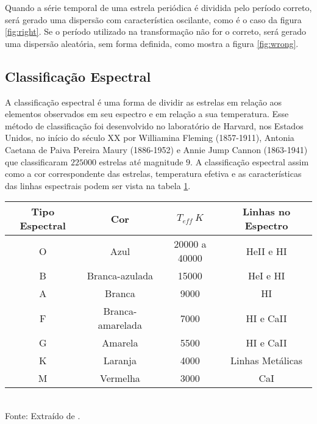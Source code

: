 Quando a série temporal de uma estrela periódica é dividida pelo período correto, será gerado uma dispersão com característica oscilante, como é o caso da figura \ref{fig:right}. Se o período utilizado na transformação não for o correto, será gerado uma dispersão aleatória, sem forma definida, como mostra a figura \ref{fig:wrong}.


\subsection{Classificação Espectral}

A classificação espectral é uma forma de dividir as estrelas em relação aos elementos observados em seu espectro e em relação a sua temperatura. Esse método de classificação foi desenvolvido no laboratório de Harvard, nos Estados Unidos, no início do século XX %
por Williamina Fleming (1857-1911), Antonia Caetana de Paiva Pereira Maury (1886-1952) e Annie Jump Cannon (1863-1941) que classificaram $225000$ estrelas até magnitude $9$.  A classificação espectral assim como a cor correspondente das estrelas, temperatura efetiva e as características das linhas espectrais podem ser vista na tabela \ref{tab:tipo_espectral}.

\begin{table}[!ht]
\begin{center}
\begin{tabular}{c|c|c|c}
\toprule%
Tipo Espectral & Cor & $T_{eff} \ \si{K}$ & Linhas no Espectro  \\
\midrule%
O & Azul & 20000 a 40000 & HeII e HI \\
B & Branca-azulada & 15000 & HeI e HI\\
A & Branca & 9000 & HI \\
F & Branca-amarelada & 7000 & HI e CaII \\
G & Amarela & 5500 & HI e CaII\\
K & Laranja & 4000 & Linhas Metálicas \\
M & Vermelha & 3000 & CaI \\
\bottomrule%
\end{tabular} \\
\small
\vspace{2mm}Fonte: Extraído de \citet{keplerLivro2013}.
\label{tab:tipo_espectral}
\end{center}
\end{table}


